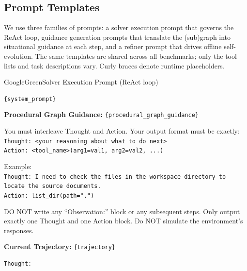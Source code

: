 \subsection{Prompt Templates}
\label{app:prompts}

We use three families of prompts: a solver execution prompt that governs the ReAct loop, guidance generation prompts that translate the (sub)graph into situational guidance at each step, and a refiner prompt that drives offline self-evolution. The same templates are shared across all benchmarks; only the tool lists and task descriptions vary. Curly braces denote runtime placeholders.

\newcommand{\pvar}[1]{\textcolor{GoogleGreen!50!black}{\texttt{\{#1\}}}}

\begin{tracebox}{GoogleGreen}{Solver Execution Prompt (ReAct loop)}
\footnotesize\raggedright
\pvar{system\_prompt}

\smallskip
\textbf{Procedural Graph Guidance:} \pvar{procedural\_graph\_guidance}

\smallskip
You must interleave Thought and Action. Your output format must be exactly:\\
\texttt{Thought: <your reasoning about what to do next>}\\
\texttt{Action: <tool\_name>(arg1=val1, arg2=val2, ...)}

\smallskip
Example:\\
\texttt{Thought: I need to check the files in the workspace directory to locate the source documents.}\\
\texttt{Action: list\_dir(path=".")}

\smallskip
DO NOT write any ``Observation:'' block or any subsequent steps. Only output exactly one Thought and one Action block. Do NOT simulate the environment's responses.

\smallskip
\textbf{Current Trajectory:} \pvar{trajectory}

\smallskip
\texttt{Thought:}
\end{tracebox}


